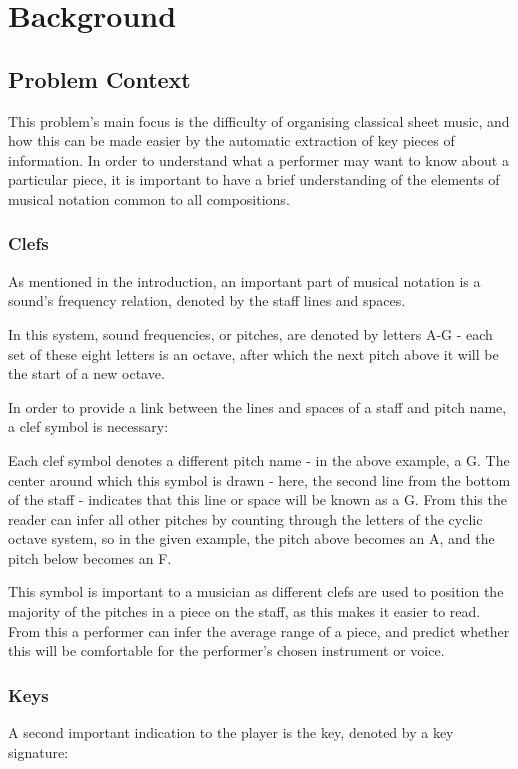 \documentclass[bibtotocnumbered]{article}
\begin{document}
\section{Background}
\subsection{Problem Context}
This problem's main focus is the difficulty of organising classical sheet music, and how this can be made easier by the automatic extraction of key pieces  of information. In order to understand what a performer may want to know about a particular piece, it is important to have a brief understanding of the elements of musical notation common to all compositions.
\subsubsection{Clefs}
As mentioned in the introduction, an important part of musical notation is a sound's frequency relation, denoted by the staff lines and spaces. 

In this system, sound frequencies, or pitches, are denoted by letters A-G - each set of these eight letters is an octave, after which the next pitch above it will be the start of a new octave.

In order to provide a link between the lines and spaces of a staff and pitch name, a clef symbol is necessary:

Each clef symbol denotes a different pitch name - in the above example, a G. The center around which this symbol is drawn - here, the second line from the bottom of the staff - indicates that this line or space will be known as a G. From this the reader can infer all other pitches by counting through the letters of the cyclic octave system, so in the given example, the pitch above becomes an A, and the pitch below becomes an F.

This symbol is important to a musician as different clefs are used to position the majority of the pitches in a piece on the staff, as this makes it easier to read. From this a performer can infer the average range of a piece, and predict whether this will be comfortable for the performer's chosen instrument or voice.

\subsubsection{Keys}
A second important indication to the player is the key, denoted by a key signature:
\end{document}
